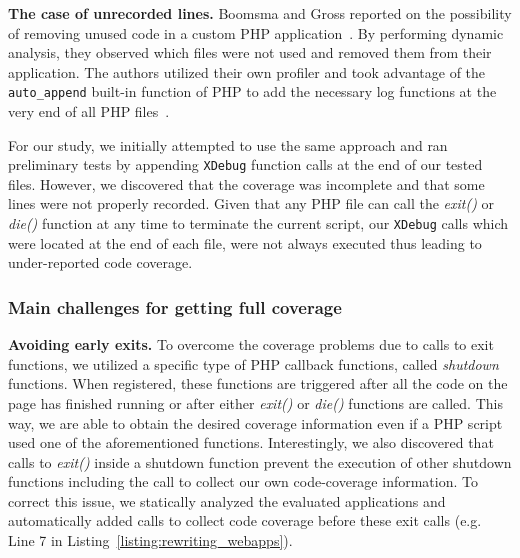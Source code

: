 \vspace{1ex}
\noindent\textbf{The case of unrecorded lines.}
Boomsma and Gross reported on the possibility of removing unused code in a
custom PHP application~\cite{boomsma2012Dead}. By performing dynamic
analysis, they observed which files were not used and removed
them from their application. The authors utilized their own profiler and took
advantage of the \texttt{auto\_append} built-in function of PHP to add
the necessary log functions at the very end of all PHP files~\cite{autoappend}.

For our study, we initially attempted to use the same approach and ran
preliminary tests by appending \texttt{XDebug} function calls at the end
of our tested files. However, we discovered that the coverage was
incomplete and that some lines were not properly recorded. Given that any
PHP file can call the \textit{exit()} or \textit{die()} function at any
time to terminate the current script, our \texttt{XDebug} calls which were
located at the end of each file, were not always executed thus leading to
under-reported code coverage.

\subsubsection{Main challenges for getting full coverage}
\label{subsubsec:challenges}

\vspace{1ex}
\noindent\textbf{Avoiding early exits.}
To overcome the coverage problems due to calls to exit functions, we
utilized a specific type of PHP callback functions, called \textit{shutdown}
functions. When registered, these functions are triggered after all the
code on the page has finished running or after either \textit{exit()} or
\textit{die()} functions are called. This way, we are able to obtain the
desired coverage information even if a PHP script used one of the aforementioned functions.
Interestingly, we also discovered that calls to \textit{exit()} inside a
shutdown function prevent the execution of other shutdown functions
including the call to collect our own code-coverage information. To correct
this issue, we statically analyzed the evaluated applications and automatically
added calls to collect code coverage before these exit calls (e.g. Line 7
in Listing~\ref{listing:rewriting_webapps}).

